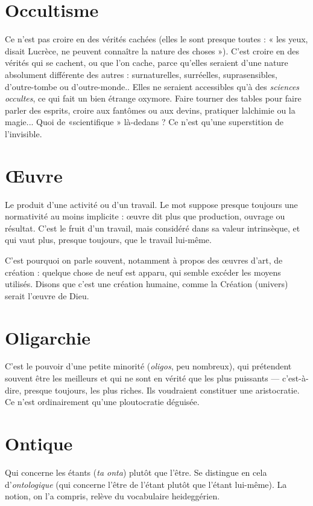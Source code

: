 \section{Occultisme}
Ce n’est pas croire en des vérités cachées (elles le sont presque
toutes : « les yeux, disait Lucrèce, ne peuvent connaître la
nature des choses »). C’est croire en des vérités qui se cachent, ou que l’on
cache, parce qu’elles seraient d’une nature absolument différente des autres :
surnaturelles, surréelles, suprasensibles, d’outre-tombe ou d’outre-monde..
Elles ne seraient accessibles qu’à des {\it sciences occultes}, ce qui fait un bien étrange
oxymore. Faire tourner des tables pour faire parler des esprits, croire aux fantômes
ou aux devins, pratiquer lalchimie ou la magie... Quoi de
«scientifique » là-dedans ? Ce n’est qu’une superstition de l’invisible.

\section{{\OE}uvre}
Le produit d’une activité ou d’un travail. Le mot suppose presque
toujours une normativité au moins implicite : œuvre dit plus que
production, ouvrage ou résultat. C’est le fruit d’un travail, mais considéré dans
sa valeur intrinsèque, et qui vaut plus, presque toujours, que le travail lui-même.

C’est pourquoi on parle souvent, notamment à propos des œuvres d’art, de
création : quelque chose de neuf est apparu, qui semble excéder les moyens utilisés.
Disons que c’est une création humaine, comme la Création (univers)
serait l’œuvre de Dieu.

\section{Oligarchie}
C'est le pouvoir d’une petite minorité ({\it oligos}, peu nombreux),
qui prétendent souvent être les meilleurs et qui ne sont en
vérité que les plus puissants — c’est-à-dire, presque toujours, les plus riches. Ils
voudraient constituer une aristocratie. Ce n’est ordinairement qu’une ploutocratie déguisée.

\section{Ontique}
Qui concerne les étants ({\it ta onta}) plutôt que l’être. Se distingue
en cela d’{\it ontologique} (qui concerne l’être de l’étant plutôt que
l’étant lui-même). La notion, on l’a compris, relève du vocabulaire heideggérien.

